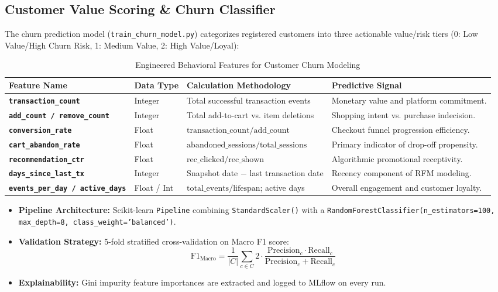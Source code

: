 \documentclass[11pt,a4paper]{article}
\begin{document}
\subsection{Customer Value Scoring \& Churn Classifier}
The churn prediction model (\texttt{train\_churn\_model.py}) categorizes registered customers into three actionable value/risk tiers (0: Low Value/High Churn Risk, 1: Medium Value, 2: High Value/Loyal):

\begin{table}[h]
\centering
\small
\begin{tabularx}{\textwidth}{@{}>{\bfseries}p{3.8cm}p{1.8cm}p{4.5cm}X@{}}
\toprule
\color{DeepNavy}Feature Name & \color{DeepNavy}Data Type & \color{DeepNavy}Calculation Methodology & \color{DeepNavy}Predictive Signal \\
\midrule
\texttt{transaction\_count} & Integer & Total successful transaction events & Monetary value and platform commitment. \\
\texttt{add\_count / remove\_count} & Integer & Total add-to-cart vs. item deletions & Shopping intent vs. purchase indecision. \\
\texttt{conversion\_rate} & Float & $\text{transaction\_count} / \text{add\_count}$ & Checkout funnel progression efficiency. \\
\texttt{cart\_abandon\_rate} & Float & $\text{abandoned\_sessions} / \text{total\_sessions}$ & Primary indicator of drop-off propensity. \\
\texttt{recommendation\_ctr} & Float & $\text{rec\_clicked} / \text{rec\_shown}$ & Algorithmic promotional receptivity. \\
\texttt{days\_since\_last\_tx} & Integer & Snapshot date $-$ last transaction date & Recency component of RFM modeling. \\
\texttt{events\_per\_day / active\_days} & Float / Int & $\text{total\_events} / \text{lifespan}$; active days & Overall engagement and customer loyalty. \\
\bottomrule
\end{tabularx}
\caption{Engineered Behavioral Features for Customer Churn Modeling}
\end{table}

\begin{itemize}
    \item \textbf{Pipeline Architecture:} Scikit-learn \texttt{Pipeline} combining \texttt{StandardScaler()} with a \texttt{RandomForestClassifier(n\_estimators=100, max\_depth=8, class\_weight='balanced')}.
    \item \textbf{Validation Strategy:} 5-fold stratified cross-validation on Macro F1 score:
    \begin{equation}
        \text{F1}_{\text{Macro}} = \frac{1}{|C|} \sum_{c \in C} 2 \cdot \frac{\text{Precision}_c \cdot \text{Recall}_c}{\text{Precision}_c + \text{Recall}_c}
    \end{equation}
    \item \textbf{Explainability:} Gini impurity feature importances are extracted and logged to MLflow on every run.
\end{itemize}
\end{document}
